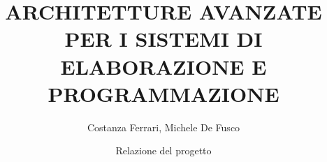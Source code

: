 \documentclass[12 pt]{report}
\begin{document}
\title{ARCHITETTURE AVANZATE PER I SISTEMI DI ELABORAZIONE E PROGRAMMAZIONE}

\author{Costanza Ferrari, Michele De Fusco}
\date{Relazione del progetto}
\maketitle


\tableofcontents






\end{document}
